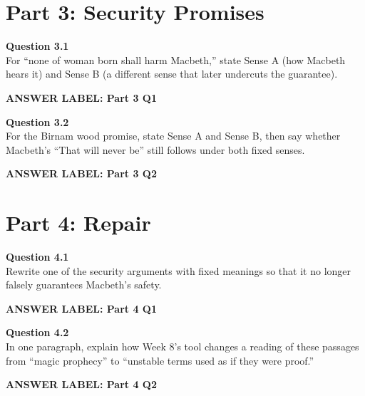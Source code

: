\documentclass[12pt]{article}
\newcommand{\answerbox}[2]{%
\vspace{0.12em}
\noindent\textbf{#1}\par
\vspace{0.04em}
\noindent\fbox{%
\begin{minipage}[t][#2]{\dimexpr\textwidth-2\fboxsep-2\fboxrule}
\rule{\textwidth}{0pt}
\vspace{#2}
\end{minipage}}
\par\vspace{0.22em}}
\begin{document}
\section*{Part 3: Security Promises}

\textbf{Question 3.1}\\[-0.15em]
For ``none of woman born shall harm Macbeth,'' state Sense A (how Macbeth hears it) and Sense B (a different sense that later undercuts the guarantee).

\answerbox{ANSWER LABEL: Part 3 Q1}{2.45in}

\textbf{Question 3.2}\\[-0.15em]
For the Birnam wood promise, state Sense A and Sense B, then say whether Macbeth's ``That will never be'' still follows under both fixed senses.

\answerbox{ANSWER LABEL: Part 3 Q2}{2.45in}

\newpage

\section*{Part 4: Repair}

\textbf{Question 4.1}\\[-0.15em]
Rewrite one of the security arguments with fixed meanings so that it no longer falsely guarantees Macbeth's safety.

\answerbox{ANSWER LABEL: Part 4 Q1}{2.55in}

\textbf{Question 4.2}\\[-0.15em]
In one paragraph, explain how Week 8's tool changes a reading of these passages from ``magic prophecy'' to ``unstable terms used as if they were proof.''

\answerbox{ANSWER LABEL: Part 4 Q2}{2.45in}
\end{document}
